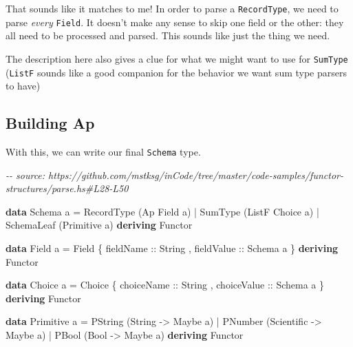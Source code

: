 \documentclass[]{article}
\newenvironment{Shaded}{}{}
\newcommand{\CommentTok}[1]{\textcolor[rgb]{0.38,0.63,0.69}{\textit{#1}}}
\newcommand{\DataTypeTok}[1]{\textcolor[rgb]{0.56,0.13,0.00}{#1}}
\newcommand{\KeywordTok}[1]{\textcolor[rgb]{0.00,0.44,0.13}{\textbf{#1}}}
\newcommand{\NormalTok}[1]{#1}
\newcommand{\OperatorTok}[1]{\textcolor[rgb]{0.40,0.40,0.40}{#1}}
\newcommand{\OtherTok}[1]{\textcolor[rgb]{0.00,0.44,0.13}{#1}}
\begin{document}
That sounds like it matches to me! In order to parse a \texttt{RecordType}, we
need to parse \emph{every} \texttt{Field}. It doesn't make any sense to skip one
field or the other: they all need to be processed and parsed. This sounds like
just the thing we need.

The description here also gives a clue for what we might want to use for
\texttt{SumType} (\texttt{ListF} sounds like a good companion for the behavior
we want sum type parsers to have)

\hypertarget{building-ap}{%
\subsection{Building Ap}\label{building-ap}}

With this, we can write our final \texttt{Schema} type.

\begin{Shaded}
\begin{Highlighting}[]
\CommentTok{{-}{-} source: https://github.com/mstksg/inCode/tree/master/code{-}samples/functor{-}structures/parse.hs\#L28{-}L50}

\KeywordTok{data} \DataTypeTok{Schema}\NormalTok{ a }\OtherTok{=}
      \DataTypeTok{RecordType}\NormalTok{  (}\DataTypeTok{Ap} \DataTypeTok{Field}\NormalTok{ a)}
    \OperatorTok{|} \DataTypeTok{SumType}\NormalTok{     (}\DataTypeTok{ListF} \DataTypeTok{Choice}\NormalTok{ a)}
    \OperatorTok{|} \DataTypeTok{SchemaLeaf}\NormalTok{  (}\DataTypeTok{Primitive}\NormalTok{ a)}
  \KeywordTok{deriving} \DataTypeTok{Functor}

\KeywordTok{data} \DataTypeTok{Field}\NormalTok{ a }\OtherTok{=} \DataTypeTok{Field}
\NormalTok{    \{}\OtherTok{ fieldName  ::} \DataTypeTok{String}
\NormalTok{    ,}\OtherTok{ fieldValue ::} \DataTypeTok{Schema}\NormalTok{ a}
\NormalTok{    \}}
  \KeywordTok{deriving} \DataTypeTok{Functor}

\KeywordTok{data} \DataTypeTok{Choice}\NormalTok{ a }\OtherTok{=} \DataTypeTok{Choice}
\NormalTok{    \{}\OtherTok{ choiceName  ::} \DataTypeTok{String}
\NormalTok{    ,}\OtherTok{ choiceValue ::} \DataTypeTok{Schema}\NormalTok{ a}
\NormalTok{    \}}
  \KeywordTok{deriving} \DataTypeTok{Functor}

\KeywordTok{data} \DataTypeTok{Primitive}\NormalTok{ a }\OtherTok{=}
      \DataTypeTok{PString}\NormalTok{ (}\DataTypeTok{String} \OtherTok{{-}>} \DataTypeTok{Maybe}\NormalTok{ a)}
    \OperatorTok{|} \DataTypeTok{PNumber}\NormalTok{ (}\DataTypeTok{Scientific} \OtherTok{{-}>} \DataTypeTok{Maybe}\NormalTok{ a)}
    \OperatorTok{|} \DataTypeTok{PBool}\NormalTok{   (}\DataTypeTok{Bool} \OtherTok{{-}>} \DataTypeTok{Maybe}\NormalTok{ a)}
  \KeywordTok{deriving} \DataTypeTok{Functor}
\end{Highlighting}
\end{Shaded}
\end{document}
